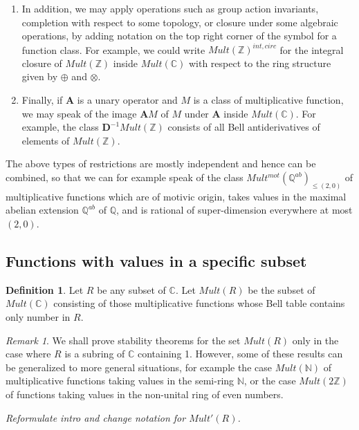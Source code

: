\documentclass[a4paper]{article}
\theoremstyle{definition}
\newtheorem{definition}{Definition}[section]
\theoremstyle{remark}
\newtheorem*{remark}{Remark}
\newcommand{\N}{\mathbb{N}}
\newcommand{\Z}{\mathbb{Z}}
\newcommand{\Q}{\mathbb{Q}}
\newcommand{\C}{\mathbb{C}}
\newcommand{\BD}{\mathbf{D}}
\begin{document}
\begin{enumerate}
\item In addition, we may apply operations such as group action invariants, completion with respect to some topology, or closure under some algebraic operations, by adding notation on the top right corner of the symbol for a function class. For example, we could write $Mult(\Z)^{int,circ}$ for the integral closure of $Mult(\Z)$ inside $Mult(\C)$ with respect to the ring structure given by $\oplus$ and $\otimes$.

\item Finally, if $\mathbf{A}$ is a unary operator and $M$ is a class of multiplicative function, we may speak of the image $\mathbf{A} M$ of $M$ under $\mathbf{A}$ inside $Mult(\C)$. For example, the class $\BD^{-1} Mult(\Z)$ consists of all Bell antiderivatives of elements of $Mult(\Z)$.  

\end{enumerate}

The above types of restrictions are mostly independent and hence can be combined, so that we can for example speak of the class $Mult^{mot}(\Q^{ab})_{\leq(2, 0)}$ of multiplicative functions which are of motivic origin, takes values in the maximal abelian extension $\mathbb{Q}^{ab}$ of $\Q$, and is rational of super-dimension everywhere at most $(2, 0)$.



\subsection{Functions with values in a specific subset}

\begin{definition}
Let $R$ be any subset of $\C$. Let $Mult(R)$ be the subset of $Mult(\C)$ consisting of those multiplicative functions whose Bell table contains only number in $R$.
\end{definition}

\begin{remark}
We shall prove stability theorems for the set $Mult(R)$ only in the case where $R$ is a subring of $\C$ containing 1. However, some of these results can be generalized to more general situations, for example the case $Mult(\N)$ of multiplicative functions taking values in the semi-ring $\N$, or the case $Mult(2 \Z)$ of functions taking values in the non-unital ring of even numbers.
\end{remark}

\emph{Reformulate intro and change notation for $Mult'(R)$.}
\end{document}
